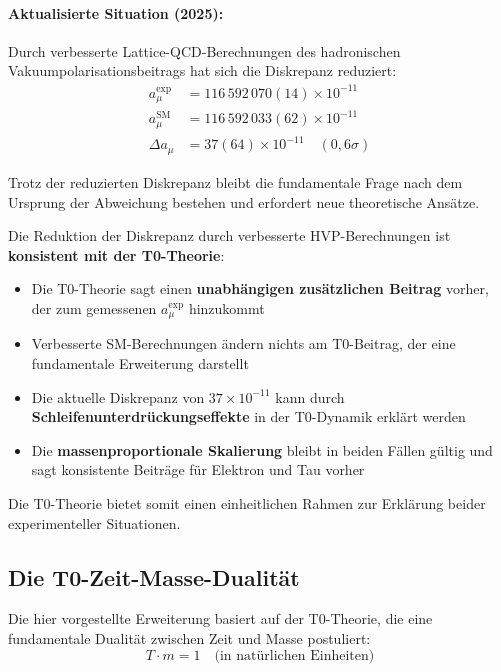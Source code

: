 \documentclass[12pt,a4paper]{article}
\theoremstyle{definition}
\begin{document}
	\paragraph{Aktualisierte Situation (2025):}
	Durch verbesserte Lattice-QCD-Berechnungen des hadronischen Vakuumpolarisationsbeitrags hat sich die Diskrepanz reduziert\cite{sm_g2_2025,mug2_final_2025}:
	\begin{align}
		a_\mu^{\text{exp}} &= 116\,592\,070(14) \times 10^{-11}\\
		a_\mu^{\text{SM}} &= 116\,592\,033(62) \times 10^{-11}\\
		\Delta a_\mu &= 37(64) \times 10^{-11} \quad (0,6\sigma) \label{eq:new_discrepancy}
	\end{align}
	
	Trotz der reduzierten Diskrepanz bleibt die fundamentale Frage nach dem Ursprung der Abweichung bestehen und erfordert neue theoretische Ansätze.
	
	\begin{explanation}
		Die Reduktion der Diskrepanz durch verbesserte HVP-Berechnungen ist \textbf{konsistent mit der T0-Theorie}:
		
		\begin{itemize}
			\item Die T0-Theorie sagt einen \textbf{unabhängigen zusätzlichen Beitrag} vorher, der zum gemessenen $a_\mu^{\text{exp}}$ hinzukommt
			\item Verbesserte SM-Berechnungen ändern nichts am T0-Beitrag, der eine fundamentale Erweiterung darstellt
			\item Die aktuelle Diskrepanz von $37 \times 10^{-11}$ kann durch \textbf{Schleifenunterdrückungseffekte} in der T0-Dynamik erklärt werden
			\item Die \textbf{massenproportionale Skalierung} bleibt in beiden Fällen gültig und sagt konsistente Beiträge für Elektron und Tau vorher
		\end{itemize}
		
		Die T0-Theorie bietet somit einen einheitlichen Rahmen zur Erklärung beider experimenteller Situationen.
	\end{explanation}
	
	\subsection{Die T0-Zeit-Masse-Dualität}
	
	Die hier vorgestellte Erweiterung basiert auf der T0-Theorie\cite{pascher_t0_theory_2025}, die eine fundamentale Dualität zwischen Zeit und Masse postuliert:
	\begin{equation}
		T \cdot m = 1 \quad \text{(in natürlichen Einheiten)}
	\end{equation}
	
\end{document}
